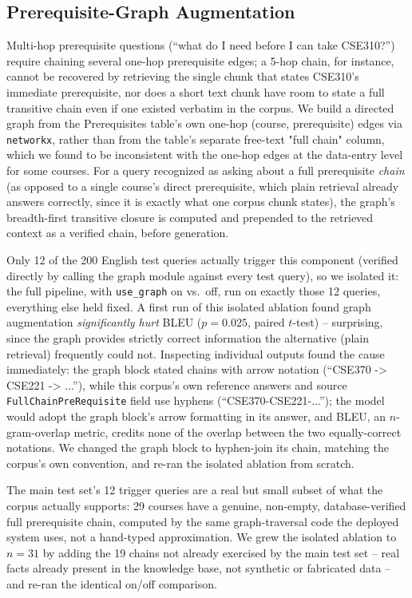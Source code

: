 \documentclass[a4paper,twoside]{article}
\begin{document}
\subsection{Prerequisite-Graph Augmentation}
\label{subsec:graph}

Multi-hop prerequisite questions (``what do I need before I can take CSE310?'') require chaining several one-hop prerequisite edges; a 5-hop chain, for instance, cannot be recovered by retrieving the single chunk that states CSE310's immediate prerequisite, nor does a short text chunk have room to state a full transitive chain even if one existed verbatim in the corpus. We build a directed graph from the Prerequisites table's own one-hop (course, prerequisite) edges via \texttt{networkx}, rather than from the table's separate free-text "full chain" column, which we found to be inconsistent with the one-hop edges at the data-entry level for some courses. For a query recognized as asking about a full prerequisite \emph{chain} (as opposed to a single course's direct prerequisite, which plain retrieval already answers correctly, since it is exactly what one corpus chunk states), the graph's breadth-first transitive closure is computed and prepended to the retrieved context as a verified chain, before generation.

Only 12 of the 200 English test queries actually trigger this component (verified directly by calling the graph module against every test query), so we isolated it: the full pipeline, with \texttt{use\_graph} on vs.\ off, run on exactly those 12 queries, everything else held fixed. A first run of this isolated ablation found graph augmentation \emph{significantly hurt} BLEU ($p=0.025$, paired $t$-test) -- surprising, since the graph provides strictly correct information the alternative (plain retrieval) frequently could not. Inspecting individual outputs found the cause immediately: the graph block stated chains with arrow notation (``CSE370 -> CSE221 -> ...''), while this corpus's own reference answers and source \texttt{FullChainPreRequisite} field use hyphens (``CSE370-CSE221-...''); the model would adopt the graph block's arrow formatting in its answer, and BLEU, an $n$-gram-overlap metric, credits none of the overlap between the two equally-correct notations. We changed the graph block to hyphen-join its chain, matching the corpus's own convention, and re-ran the isolated ablation from scratch.

The main test set's 12 trigger queries are a real but small subset of what the corpus actually supports: 29 courses have a genuine, non-empty, database-verified full prerequisite chain, computed by the same graph-traversal code the deployed system uses, not a hand-typed approximation. We grew the isolated ablation to $n=31$ by adding the 19 chains not already exercised by the main test set -- real facts already present in the knowledge base, not synthetic or fabricated data -- and re-ran the identical on/off comparison.
\end{document}
